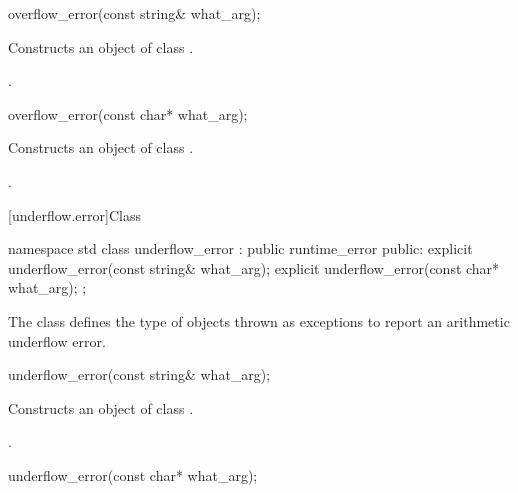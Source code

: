 %
\begin{itemdecl}
overflow_error(const string& what_arg);
\end{itemdecl}

\begin{itemdescr}
\pnum
\effects
Constructs an object of class
.

\pnum
\postcondition
{}.
\end{itemdescr}

%
\begin{itemdecl}
overflow_error(const char* what_arg);
\end{itemdecl}

\begin{itemdescr}
\pnum
\effects
Constructs an object of class
.

\pnum
\postcondition
{}.
\end{itemdescr}

[underflow.error]{Class }

%
\begin{codeblock}
namespace std {
  class underflow_error : public runtime_error {
  public:
    explicit underflow_error(const string& what_arg);
    explicit underflow_error(const char* what_arg);
  };
}
\end{codeblock}

\pnum
The class
defines the type of objects thrown as exceptions to report an arithmetic underflow error.

%
\begin{itemdecl}
underflow_error(const string& what_arg);
\end{itemdecl}

\begin{itemdescr}
\pnum
\effects
Constructs an object of class
.

\pnum
\postcondition
{}.
\end{itemdescr}

%
\begin{itemdecl}
underflow_error(const char* what_arg);
\end{itemdecl}

